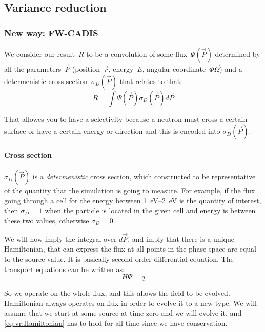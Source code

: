 \subsection{Variance reduction}

\subsubsection{New way: FW-CADIS}
We consider our result~$R$ to be a convolution of some
flux~$\Psi(\vec{P})$ determined by all the parameters~$\vec{P}$
(position~$\vec{r}$, energy~$E$, angular
coordinate~$\Phi\vec{\Omega}$) and a determenistic cross
section~$\sigma_D(\vec{P})$ that relates to that:
\begin{equation}
  \label{eq:vr:result}
  R = \int \Psi(\vec{P}) \sigma_D(\vec{P}) d\vec{P}
\end{equation}

That allowes you to have a selectivity because a neutron must cross a
certain surface or have a certain energy or direction and this is encoded into $\sigma_D(\vec{P})$.

\paragraph{Cross section}
$\sigma_D(\vec{P})$ is a {\em determenistic} cross section, which constructed to be representative of the quantity
that the simulation is going to measure. For example, if the flux going through a cell for the energy between
\SIrange[range-phrase=\ and\ ]{1}{2}{\electronvolt} is the quantity of interest, then
$\sigma_D=1$ when the particle is located in the given cell and energy is between these two values,
otherwise $\sigma_D=0$.

\bigskip

We will now imply the integral over $d\vec{P}$, and imply that there is a unique Hamiltonian,
that can express the flux at all points in the phase space are equal to the source value. It is basically
second order differential equation. The transport equations can be written as:
\begin{equation}
  \label{eq:vr:Hamiltonian}
  H \Psi = q
\end{equation}


So we operate on the whole flux, and this allows the field to be evolved.
Hamiltonian always operates on flux in order to evolve it to a new type.
We will assume that we start at some source at time zero and we will evolve it, and \eqref{eq:vr:Hamiltonian} has to
hold for all time since we have conservation.

